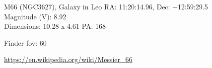 \begin{block}{M66 (NGC3627), Galaxy in Leo}
    RA: 11:20:14.96, Dec: +12:59:29.5 \\ 
    Magnitude (V): 8.92 \\ 
    Dimensions: 10.28 x 4.61 PA: 168 

    Finder fov: 60 

    \url{https://en.wikipedia.org/wiki/Messier_66} 
\end{block}